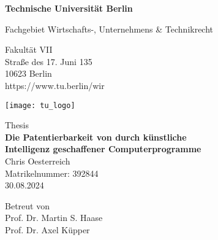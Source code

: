 \thispagestyle{empty}
\begin{center}

\vspace*{1.4cm}
{\LARGE \textbf{Technische Universität Berlin}}

\vspace{0.5cm}

{\large Fachgebiet Wirtschafts-, Unternehmens \& Technikrecht\\[1mm]}

Fakultät VII\\
Straße des 17. Juni 135\\
10623 Berlin\\
https://www.tu.berlin/wir\\

\vspace*{1cm}

\texttt{[image: tu\_logo]}

\vspace*{1.0cm}

{\LARGE Thesis}\\

\vspace{1.0cm}
{\LARGE \textbf{Die Patentierbarkeit von durch künstliche }}\\
\vspace*{0.3cm}
{\LARGE \textbf{Intelligenz geschaffener Computerprogramme}}\\
\vspace*{1.0cm}
{\LARGE Chris Oesterreich}
\\
\vspace*{0.5cm}
Matrikelnummer: 392844\\
30.08.2024\\ %
\vspace*{1.0cm}

Betreut von\\
Prof. Dr. Martin S. Haase\\
Prof. Dr. Axel Küpper


\end{center}

